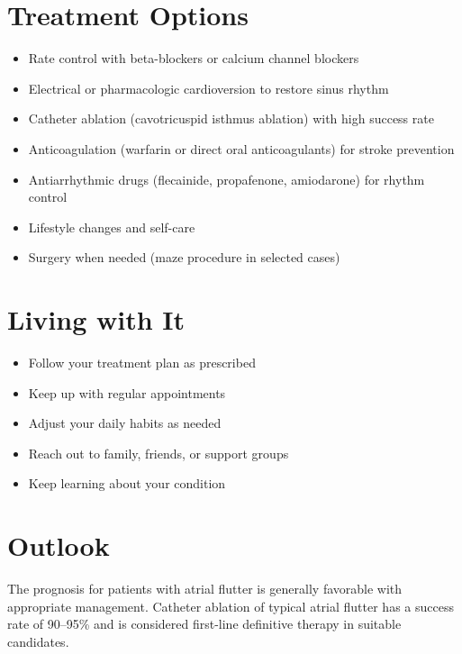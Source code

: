 \section{Treatment Options}

\begin{itemize}[noitemsep]
  \item Rate control with beta-blockers or calcium channel blockers
  \item Electrical or pharmacologic cardioversion to restore sinus rhythm
  \item Catheter ablation (cavotricuspid isthmus ablation) with high success rate
  \item Anticoagulation (warfarin or direct oral anticoagulants) for stroke prevention
  \item Antiarrhythmic drugs (flecainide, propafenone, amiodarone) for rhythm control
  \item Lifestyle changes and self-care
  \item Surgery when needed (maze procedure in selected cases)
\end{itemize}

\section{Living with It}

\begin{itemize}[noitemsep]
  \item Follow your treatment plan as prescribed
  \item Keep up with regular appointments
  \item Adjust your daily habits as needed
  \item Reach out to family, friends, or support groups
  \item Keep learning about your condition
\end{itemize}

\section{Outlook}
The prognosis for patients with atrial flutter is generally favorable with appropriate management. Catheter ablation of typical atrial flutter has a success rate of 90--95\% and is considered first-line definitive therapy in suitable candidates.
